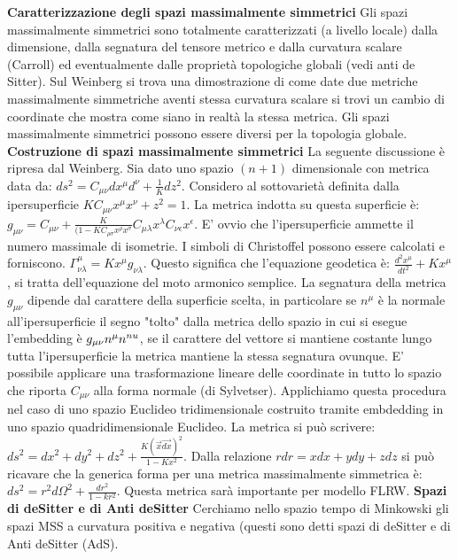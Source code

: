 \documentclass[10pt,a4paper]{article}
\begin{document}
\textbf{Caratterizzazione degli spazi massimalmente simmetrici}
Gli spazi massimalmente simmetrici sono totalmente caratterizzati (a livello locale) dalla dimensione, dalla segnatura del tensore metrico e dalla curvatura scalare (Carroll) ed eventualmente dalle proprietà topologiche globali (vedi anti de Sitter). Sul Weinberg si trova una dimostrazione di come date due metriche massimalmente simmetriche aventi stessa curvatura scalare si trovi un cambio di coordinate che mostra come siano in realtà la stessa metrica. Gli spazi massimalmente simmetrici possono essere diversi per la topologia globale.
\textbf{Costruzione di spazi massimalmente simmetrici}
La seguente discussione è ripresa dal Weinberg. Sia dato uno spazio $(n+1)$ dimensionale con metrica data da: $ds^2 = C_{\mu \nu} dx^{\mu} d^{\nu} + \frac{1}{K} dz^2$. Considero al sottovarietà definita dalla ipersuperficie $KC_{\mu \nu} x^{\mu} x^{\nu} + z^2 = 1$. La metrica indotta su questa superficie è: $g_{\mu \nu} = C_{\mu \nu} + \frac{K}{(1-KC_{\rho \sigma} x^{\rho} x^{\sigma}} C_{\mu \lambda} x^{\lambda} C_{\nu \epsilon} x^{\epsilon}$. E' ovvio che l'ipersuperficie ammette il numero massimale di isometrie. I simboli di Christoffel possono essere calcolati e forniscono. $\Gamma^{\mu}_{\nu \lambda} = K x^{\mu} g_{\nu \lambda}$. Questo significa che l'equazione geodetica è: $\frac{d^2 x^{\mu}}{dt^2} + K x^{\mu}$, si tratta dell'equazione del moto armonico semplice. La segnatura della metrica $g_{\mu \nu}$ dipende dal carattere della superficie scelta, in particolare se $n^{\mu}$ è la normale all'ipersuperficie il segno "tolto" dalla metrica dello spazio in cui si esegue l'embedding è $g_{\mu \nu} n^{\mu} n^{\\nu}$, se il carattere del vettore si mantiene costante lungo tutta l'ipersuperficie la metrica mantiene la stessa segnatura ovunque.
E' possibile applicare una trasformazione lineare delle coordinate in tutto lo spazio che riporta $C_{\mu \nu}$ alla forma normale (di Sylvetser). 
Applichiamo questa procedura nel caso di uno spazio Euclideo tridimensionale costruito tramite embdedding in uno spazio quadridimensionale Euclideo. La metrica si può scrivere: $ds^2 =dx^2+dy^2+dz^2+\frac{K(\vec{x} \vec{dx})^{2}}{1-K x^2}$. Dalla relazione $r dr = x dx + y dy +z dz$ si può ricavare che la generica forma per una metrica massimalmente simmetrica è: $ds^2 = r^2 d\Omega^2 + \frac{dr^2}{1-k r^2}$. Questa metrica sarà importante per modello FLRW.
\textbf{Spazi di deSitter e di Anti deSitter}
Cerchiamo nello spazio tempo di Minkowski gli spazi MSS a curvatura positiva e negativa (questi sono detti spazi di deSitter e di Anti deSitter (AdS).
\end{document}
